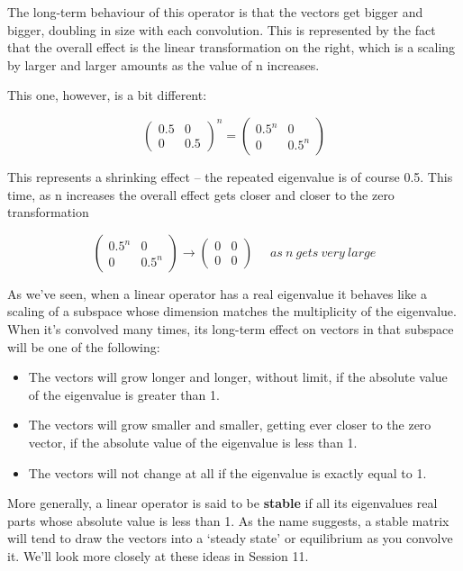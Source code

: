 \documentclass[oneside,english]{amsbook}
\numberwithin{section}{chapter}
\theoremstyle{plain}
\theoremstyle{definition}
\begin{document}
The long-term behaviour of this operator is that the vectors get bigger
and bigger, doubling in size with each convolution. This is represented
by the fact that the overall effect is the linear transformation on the
right, which is a scaling by larger and larger amounts as the value of n
increases.

This one, however, is a bit different:

\[\begin{pmatrix}
	0.5 & 0 \\
	0 & 0.5
\end{pmatrix}^{n} = \begin{pmatrix}
	{0.5}^{n} & 0 \\
	0 & {0.5}^{n}
\end{pmatrix}\]

This represents a shrinking effect -- the repeated eigenvalue is of
course 0.5. This time, as n increases the overall effect gets closer and
closer to the zero transformation

\[\begin{pmatrix}
	{0.5}^{n} & 0 \\
	0 & {0.5}^{n}
\end{pmatrix} \rightarrow \begin{pmatrix}
	0 & 0 \\
	0 & 0
\end{pmatrix}\ \ \ \ \ \ as\ n\ gets\ very\ large\]

As we've seen, when a linear operator has a real eigenvalue it behaves
like a scaling of a subspace whose dimension matches the multiplicity of
the eigenvalue. When it's convolved many times, its long-term effect on
vectors in that subspace will be one of the following:

\begin{itemize}
	\item
	The vectors will grow longer and longer, without limit, if the
	absolute value of the eigenvalue is greater than 1.
	\item
	The vectors will grow smaller and smaller, getting ever closer to the
	zero vector, if the absolute value of the eigenvalue is less than 1.
	\item
	The vectors will not change at all if the eigenvalue is exactly equal
	to 1.
\end{itemize}

More generally, a linear operator is said to be \textbf{stable} if all
its eigenvalues real parts whose absolute value is less than 1. As the
name suggests, a stable matrix will tend to draw the vectors into a
`steady state' or equilibrium as you convolve it. We'll look more
closely at these ideas in Session 11.
\end{document}
